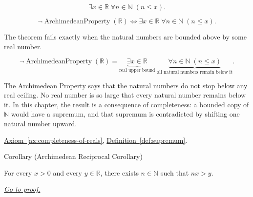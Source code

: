 \begin{remark*}
\[
\exists x\in\mathbb{R}\;\forall n\in\mathbb{N}\;(n\le x).
\]
\end{remark*}

\begin{remark*}
\[
\neg\operatorname{ArchimedeanProperty}(\mathbb{R})\Longleftrightarrow
\exists x\in\mathbb{R}\;\forall n\in\mathbb{N}\;(n\le x).
\]
\end{remark*}

\begin{remark*}
The theorem fails exactly when the natural numbers are bounded above by some real number.
\end{remark*}

\begin{remark*}
\[
\neg\operatorname{ArchimedeanProperty}(\mathbb{R})
=
\underbrace{\exists x\in\mathbb{R}}_{\text{real upper bound}}
\;\underbrace{\forall n\in\mathbb{N}\;(n\le x)}_{\text{all natural numbers remain below it}}.
\]
\end{remark*}

\begin{remark*}[Interpretation]
The Archimedean Property says that the natural numbers do not stop below any real ceiling. No real number is so large that every natural number remains below it. In this chapter, the result is a consequence of completeness: a bounded copy of $\mathbb{N}$ would have a supremum, and that supremum is contradicted by shifting one natural number upward.
\end{remark*}

\begin{dependencies}
\hyperref[ax:completeness-of-reals]{Axiom~\ref*{ax:completeness-of-reals}},
\hyperref[def:supremum]{Definition~\ref*{def:supremum}}.
\end{dependencies}
















\begin{corollarybox}{Corollary (Archimedean Reciprocal Corollary)}
\begin{corollary}
\label{cor:archimedean-reciprocal}
For every $x>0$ and every $y\in\mathbb{R}$, there exists $n\in\mathbb{N}$ such that $nx>y$.

\smallskip
\noindent
\hyperref[prf:archimedean-reciprocal]{\textit{Go to proof.}}
\end{corollary}
\end{corollarybox}

